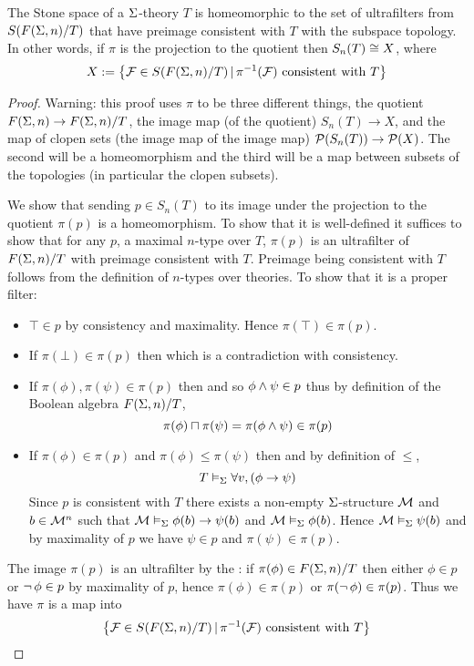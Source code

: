 \begin{prop}
    The Stone space of a $\Sigma$-theory $T$ is homeomorphic 
    to the set of ultrafilters from $S(F(\Sigma,n) / T)$ 
    that have preimage consistent with $T$ with the subspace topology.
    In other words, if $\pi$ is the projection to the quotient then
    $S_n(T) \cong X$, where
    \[X := 
    \left\{\mathcal{F} \in S(F(\Sigma,n) / T) \,|\, \pi^{-1}(\mathcal{F}) \text{ consistent with } T\right\}\]
\end{prop}
\begin{proof}
    Warning: this proof uses $\pi$ to be three different things,
    the quotient $F(\Sigma,n) \to F(\Sigma,n) / T$, 
    the image map (of the quotient) $S_n(T) \to X$, 
    and the map of clopen sets (the image map of the image map) 
    $\mathcal{P}(S_n(T)) \to \mathcal{P}(X)$.
    The second will be a homeomorphism and the third will be a map between
    subsets of the topologies (in particular the clopen subsets).

    We show that sending $p \in S_n(T)$ to its image under the projection 
    to the quotient $\pi(p)$ is a homeomorphism.
    To show that it is well-defined it suffices to show that for any $p$, a 
    maximal $n$-type over $T$, $\pi(p)$ is an ultrafilter of $F(\Sigma,n) / T$
    with preimage consistent with $T$.
    Preimage being consistent with $T$ 
    follows from the definition of $n$-types over theories.
    To show that it is a proper filter:
    \begin{itemize}
        \item $\top \in p$ by consistency and maximality. 
            Hence $\pi(\top) \in \pi(p)$.
        \item If $\pi(\bot) \in \pi(p)$ then
            which is a contradiction with consistency.
        \item If $\pi(\phi), \pi(\psi) \in \pi(p)$ then 
             and so
            $\phi \land \psi \in p$ thus by definition of the Boolean algebra 
            $F(\Sigma,n) / T$, 
            \[\pi(\phi) \sqcap \pi(\psi) = \pi(\phi \land \psi) \in \pi(p)\]
        \item If $\pi(\phi) \in \pi(p)$ and $\pi(\phi) \leq \pi(\psi)$ then 
            and by definition of $\leq$,
            \[T \vDash_{\Sigma} \forall v, (\phi \to \psi)\]
            Since $p$ is consistent with $T$ there exists a non-empty
            $\Sigma$-structure $\mathcal{M}$ and $b \in {\mathcal{M}}^n$ such that 
            $\mathcal{M} \vDash_{\Sigma} \phi(b) \to \psi(b)$ and $\mathcal{M} \vDash_{\Sigma} \phi(b)$.
            Hence $\mathcal{M} \vDash_{\Sigma} \psi(b)$ and by maximality of $p$ we have 
            $\psi \in p$ and $\pi(\psi) \in \pi(p)$.
    \end{itemize}
    The image $\pi(p)$ is an ultrafilter by the 
    :
    if $\pi(\phi) \in F(\Sigma,n) / T$ then either 
    $\phi \in p$ or $\neg\, \phi \in p$ by maximality of $p$, 
    hence $\pi(\phi) \in \pi(p)$ or $\pi(\neg\, \phi) \in \pi(p)$.
    Thus we have $\pi$ is a map into \[
    \left\{\mathcal{F} \in S(F(\Sigma,n) / T) \,|\, \pi^{-1}(\mathcal{F}) \text{ consistent with } T\right\}\]


\end{proof}
